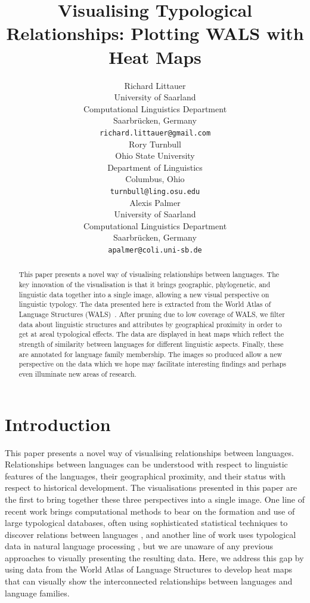 \documentclass[11pt]{article}
\title{Visualising Typological Relationships: Plotting WALS with Heat Maps}
\author{Richard Littauer \\
 University of Saarland\\
 Computational Linguistics Department\\
 Saarbr\"ucken, Germany\\
   {\tt richard.littauer@gmail.com} \\\And
 Rory Turnbull \\
 Ohio State University\\
 Department of Linguistics\\
 Columbus, Ohio\\
   {\tt turnbull@ling.osu.edu} \\\AND
 Alexis Palmer\\
 University of Saarland\\
 Computational Linguistics Department\\
 Saarbr\"ucken, Germany\\
   {\tt apalmer@coli.uni-sb.de}\\}
\date{}
\begin{document}
\maketitle

\begin{abstract}
This paper presents a novel way of visualising relationships between languages. The key innovation of the visualisation is that it brings geographic, phylogenetic, and linguistic data together into a single image, allowing a new visual perspective on linguistic typology. The data presented here is extracted from the World Atlas of Language Structures (WALS)~\cite{wals-2011}. After pruning due to low coverage of WALS, we filter data about linguistic structures and attributes by geographical proximity in order to get at areal typological effects. The data are displayed in heat maps which reflect the strength of similarity between languages for different linguistic aspects. Finally, these are annotated for language family membership. The images so produced allow a new perspective on the data which we hope may facilitate interesting findings and perhaps even illuminate new areas of research.
\end{abstract}

\section{Introduction}

This paper presents a novel way of visualising relationships between languages. Relationships between languages can be understood with respect to linguistic features of the languages, their geographical proximity, and their status with respect to historical development. The visualisations presented in this paper are the first to bring together these three perspectives into a single image. One line of recent work brings computational methods to bear on the formation and use of large typological databases, often using sophisticated statistical techniques to discover relations between languages \cite[among others]{cysouw2011,daume07implication,daume09areal}, and another line of work uses typological data in natural language processing \cite[for example]{georgi:etal:10,lewis:xia:08}, but we are unaware of any previous approaches to visually presenting the resulting data. Here, we address this gap by using data from the World Atlas of Language Structures \cite{wals-2011} to develop heat maps that can visually show the interconnected relationships between languages and language families. 
\end{document}
